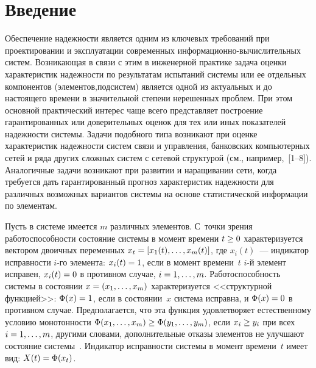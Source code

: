       \begin{multicols}{2}

            \label{st\stat}     
     
\section{Введение}

     Обеспечение надежности является одним из ключевых требований при 
проектировании и эксплуатации современных информационно-вы\-чис\-ли\-тель\-ных 
сис\-тем. Возникающая в связи с этим в инженерной 
практике задача оценки характеристик надежности по результатам 
испытаний сис\-те\-мы или ее отдельных компонентов (элементов,\linebreak под\-сис\-тем) 
является одной из актуальных и до настояще\-го времени в значительной 
степени нерешенных проблем. При этом основной практический интерес 
чаще всего представляет по\-стро\-ение гарантированных или доверительных 
оценок для тех или иных показателей надежности сис\-те\-мы. Задачи 
подобного типа возникают при оценке характеристик надежности сис\-тем 
связи и управления, банковских компьютерных сетей и ряда других сложных 
сис\-тем с сетевой структурой (см., например,~[1--8]). Аналогичные задачи 
возникают при развитии и наращивании сети, когда требуется дать 
гарантированный прогноз характеристик надежности для различных 
возможных вариантов сис\-те\-мы на основе статистической информации по 
элементам.
     
     Пусть в сис\-теме имеется $m$ различных элементов. С~точки зрения 
работоспособности состояние сис\-те\-мы в момент времени $t\hm\geq 0$ 
характеризуется вектором двоичных переменных $x_t\hm= [x_1(t), \ldots , 
x_m(t)]$, где $x_i(t)$~--- индикатор исправности $i$-го элемента: 
$x_i(t)\hm=1$, если в момент времени~$t$ $i$-й элемент исправен, 
$x_i(t)\hm=0$  в противном случае, $i\hm= 1, \ldots , m$. Работоспособность 
сис\-те\-мы в состоянии $x\hm= (x_1,\ldots , x_m)$ характеризуется 
<<структурной функцией>>: $\Phi(x)\hm=1$, если в состоянии~$x$  сис\-те\-ма исправна, и  
$\Phi(x)\hm=0$
в противном случае. Предполагается, что эта функция удовле\-тво\-ря\-ет 
естественному условию мо\-но\-тон\-ности $\Phi(x_1,\ldots ,x_m)\hm\geq \Phi(y_1, 
\ldots ,y_m)$,  если $x_i\hm\geq y_i$  при всех $i\hm= 1,\ldots , m$, другими 
словами, дополнительные отказы элементов не улучшают состояние 
сис\-те\-мы~\cite{1-pav, 2-pav}. Индикатор исправности сис\-те\-мы в момент 
времени~$t$ имеет вид: $X(t)\hm= \Phi(x_t)$.
{

}
\end{multicols}
